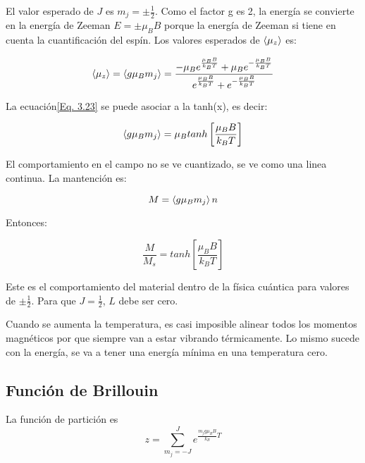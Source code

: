 \documentclass[11pt,fleqn]{book}
\begin{document}
El valor esperado de $J$ es $m_{j}=\pm\frac{1}{2}$. Como el factor g es 2, la energía se convierte en la energía de Zeeman $E=\pm\mu_{B}B$ porque la energía de Zeeman si tiene en cuenta la cuantificación del espín. Los valores esperados de $\braket{\mu_{z}}$ es:

\begin{equation}
 \braket{\mu_{z}}=\braket{g\mu_{B}m_{j}}=\frac{-\mu_{B}e^{\frac{\mu_{B}B}{k_{B}T}}+ \mu_{B}e^{-\frac{\mu_{B}B}{k_{B}T}}}{e^{\frac{\mu_{B}B}{k_{B}T}}+e^{-\frac{\mu_{B}B}{k_{B}T}}}
 \label{Eq. 3.23}
\end{equation}

La ecuación\ref{Eq. 3.23} se puede asociar a la tanh(x), es decir:

\begin{equation}
    \braket{g\mu_{B}m_{j}}=\mu_{B}tanh\left[\frac{\mu_{B}B}{k_{B}T}\right]
    \label{Eq. 3.24}
\end{equation}

El comportamiento en el campo no se ve cuantizado, se ve como una linea continua. La mantención es:

\begin{equation}
    M=\braket{g\mu_{B}m_{j}}n
    \label{Eq. 3.25}
\end{equation}

Entonces:

\begin{equation}
    \frac{M}{M_{s}}=tanh\left[\frac{\mu_{B}B}{k_{B}T}\right]
    \label{Eq. 3.26}
\end{equation}

Este es el comportamiento del material dentro de la física cuántica para valores de $\pm\frac{1}{2}$. Para que $J=\frac{1}{2}$, $L$ debe ser cero.


Cuando se aumenta la temperatura, es casi imposible alinear todos los momentos magnéticos por que siempre van a estar vibrando térmicamente. Lo mismo sucede con la energía, se va a tener una energía mínima en una temperatura cero.
        
        
\subsection{Función de Brillouin}\label{fb}
 
 La función de partición es
 \begin{equation}
     z=\sum_{m_{j}=-J}^{J} e^{\frac{m_{j}g\mu_{B}B}{k_{B}}T}
     \label{Eq. 3.27}
 \end{equation}
\end{document}
